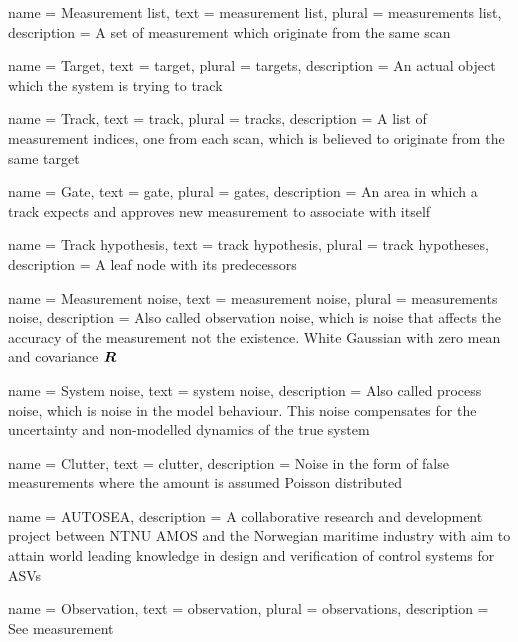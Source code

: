 {
	name 		= {Measurement list},
	text 		= {measurement list},
	plural		= {measurements list},
	description = {A set of measurement which originate from the same scan}
}

{
	name 		= Target,
	text 		= target,
	plural		= targets,
	description = {An actual object which the system is trying to track}
}

{
	name 		= Track,
	text 		= track,
	plural 		= tracks,
	description = {A list of measurement indices, one from each scan, which is believed to originate from the same target}
}

{
	name 		= Gate,
	text 		= gate,
	plural		= gates,
	description = {An area in which a track expects and approves new measurement to associate with itself}
}

{
	name 		= {Track hypothesis},
	text 		= {track hypothesis},
	plural		= {track hypotheses},
	description = {A leaf node with its predecessors}
}

{
	name 		= {Measurement noise},
	text 		= {measurement noise},
	plural		= {measurements noise},
	description = {Also called observation noise, which is noise that affects the accuracy of the measurement not the existence. White Gaussian with zero mean and covariance \(\bm{R}\)}
}

{
	name 		= {System noise},
	text 		= {system noise}, 
	description = {Also called process noise, which is noise in the model behaviour. This noise compensates for the uncertainty and non-modelled dynamics of the true system}
}

{
	name 		= Clutter,
	text 		= clutter,
	description = {Noise in the form of false measurements where the amount is assumed Poisson distributed}
}

{
	name = {AUTOSEA},
	description = {A collaborative research and development project between NTNU AMOS  and the Norwegian maritime industry with aim to attain world leading knowledge in design and verification of control systems for ASVs}
}

{
	name 		= Observation,
	text 		= observation,
	plural 		= observations,
	description = {See \Gls{measurement}}
}